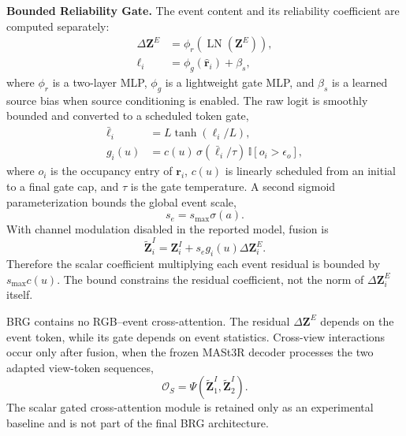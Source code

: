 \vspace{+5pt}
\noindent\textbf{Bounded Reliability Gate.}
The event content and its reliability coefficient are computed separately:
\begin{align}
\Delta\mathbf{Z}^{E}
&=\phi_r\!\left(\operatorname{LN}(\mathbf{Z}^{E})\right),
\label{eq:event_residual}\\
\ell_i
&=\phi_g(\hat{\mathbf{r}}_i)+\beta_s,
\label{eq:gate_logit}
\end{align}
where $\phi_r$ is a two-layer MLP, $\phi_g$ is a lightweight gate MLP, and
$\beta_s$ is a learned source bias when source conditioning is enabled.  The
raw logit is smoothly bounded and converted to a scheduled token gate,
\begin{align}
\bar\ell_i
&=L\tanh(\ell_i/L), \\
g_i(u)
&=c(u)\,\sigma(\bar\ell_i/\tau)\,
\mathbb{I}[o_i>\epsilon_o],
\label{eq:bounded_reliability_gate}
\end{align}
where $o_i$ is the occupancy entry of $\mathbf{r}_i$, $c(u)$ is linearly
scheduled from an initial to a final gate cap, and $\tau$ is the gate
temperature.  A second sigmoid parameterization bounds the global event scale,
\begin{equation}
s_e=s_{\max}\sigma(a).
\label{eq:event_global_scale}
\end{equation}
With channel modulation disabled in the reported model, fusion is
\begin{equation}
\widetilde{\mathbf{Z}}^{I}_{i}
=\mathbf{Z}^{I}_{i}
+s_e g_i(u)\Delta\mathbf{Z}^{E}_{i}.
\label{eq:gated_fusion}
\end{equation}
Therefore the scalar coefficient multiplying each event residual is bounded by
$s_{\max}c(u)$.  The bound constrains the residual coefficient, not the norm of
$\Delta\mathbf{Z}^{E}_{i}$ itself.

BRG contains no RGB--event cross-attention.  The residual
$\Delta\mathbf{Z}^{E}$ depends on the event token, while its gate depends on
event statistics.  Cross-view interactions occur only after fusion, when the
frozen MASt3R decoder processes the two adapted view-token sequences,
\begin{equation}
\mathcal{O}_{S}
=\Psi\!\left(
\widetilde{\mathbf{Z}}^{I}_{1},
\widetilde{\mathbf{Z}}^{I}_{2}
\right).
\label{eq:adapted_prediction}
\end{equation}
The scalar gated cross-attention module is retained only as an experimental
baseline and is not part of the final BRG architecture.


